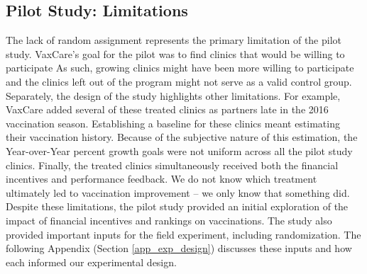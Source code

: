  \begin{table}
 \end{table}

\subsection{Pilot Study: Limitations}
The lack of random assignment represents the primary limitation of the pilot study. VaxCare’s goal for the pilot was to find clinics that would be willing to participate As such, growing clinics might have been more willing to participate and the clinics left out of the program might not serve as a valid control group. Separately, the design of the study highlights other limitations. For example, VaxCare added several of these treated clinics as partners late in the 2016 vaccination season. Establishing a baseline for these clinics meant estimating their vaccination history. Because of the subjective nature of this estimation, the Year-over-Year percent growth goals were not uniform across all the pilot study clinics. Finally, the treated clinics simultaneously received both the financial incentives and performance feedback. We do not know which treatment ultimately led to vaccination improvement – we only know that something did. Despite these limitations, the pilot study provided an initial exploration of the impact of financial incentives and rankings on vaccinations. The study also provided important inputs for the field experiment, including randomization. The following Appendix (Section \ref{app_exp_design}) discusses these inputs and how each informed our experimental design. 



